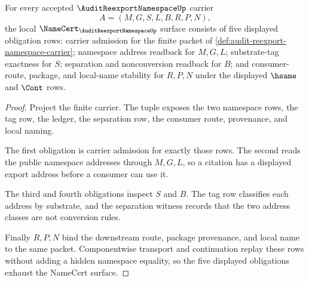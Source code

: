 \begin{theorem}
\label{thm:audit-reexport-namespace-namecert-obligations}
For every accepted $\AuditReexportNamespaceUp$ carrier
$$
A=(M,G,S,L,B,R,P,N),
$$
the local $\NameCert_{\AuditReexportNamespaceUp}$ surface consists of five displayed obligation rows: carrier admission for the finite packet of \autoref{def:audit-reexport-namespace-carrier}; namespace address readback for $M,G,L$; substrate-tag exactness for $S$; separation and nonconversion readback for $B$; and consumer-route, package, and local-name stability for $R,P,N$ under the displayed $\hsame$ and $\Cont$ rows.
\end{theorem}
\begin{proof}
Project the finite carrier. The tuple exposes the two namespace rows, the tag row, the ledger, the separation row, the consumer route, provenance, and local naming.

The first obligation is carrier admission for exactly those rows. The second reads the public namespace addresses through $M,G,L$, so a citation has a displayed export address before a consumer can use it.

The third and fourth obligations inspect $S$ and $B$. The tag row classifies each address by substrate, and the separation witness records that the two address classes are not conversion rules.

Finally $R,P,N$ bind the downstream route, package provenance, and local name to the same packet. Componentwise transport and continuation replay these rows without adding a hidden namespace equality, so the five displayed obligations exhaust the NameCert surface.
\end{proof}

